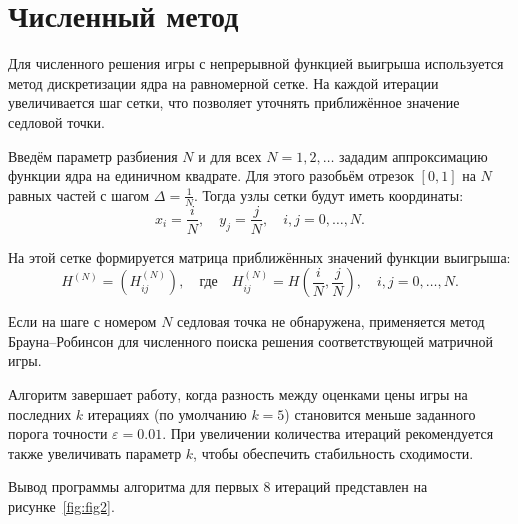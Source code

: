 \section{Численный метод}

Для численного решения игры с непрерывной функцией выигрыша используется метод
дискретизации ядра на равномерной сетке. На каждой итерации увеличивается шаг сетки, что
позволяет уточнять приближённое значение седловой точки.

Введём параметр разбиения \(N\) и для всех \(N = 1, 2, \ldots\) зададим аппроксимацию
функции ядра на единичном квадрате. Для этого разобьём отрезок \([0, 1]\) на \(N\)
равных частей с шагом \(\Delta = \frac{1}{N}\). Тогда узлы сетки будут иметь координаты:
\[
x_i = \frac{i}{N}, \quad y_j = \frac{j}{N}, \quad i, j = 0, \ldots, N.
\]

На этой сетке формируется матрица приближённых значений функции выигрыша:
\[
H^{(N)} = \left(H_{ij}^{(N)}\right), \quad \text{где} \quad H_{ij}^{(N)} = H\left( \frac{i}{N}, \frac{j}{N} \right), \quad i, j = 0, \ldots, N.
\]

Если на шаге с номером \(N\) седловая точка не обнаружена, применяется метод
Брауна–Робинсон для численного поиска решения соответствующей матричной игры.

Алгоритм завершает работу, когда разность между оценками цены игры на последних \(k\)
итерациях (по умолчанию \(k = 5\)) становится меньше заданного порога точности
\(\varepsilon = 0.01\). При увеличении количества итераций рекомендуется также увеличивать
параметр \(k\), чтобы обеспечить стабильность сходимости.

Вывод программы алгоритма для первых 8 итераций представлен на рисунке~\ref{fig:fig2}.

